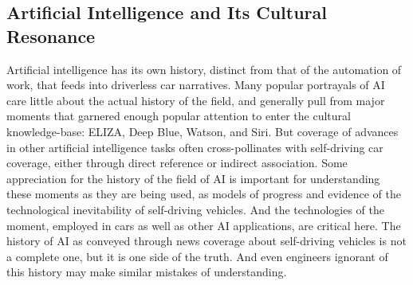 \subsection{Artificial Intelligence and Its Cultural Resonance}
Artificial intelligence has its own history, distinct from that of the
automation of work, that feeds into driverless car narratives. Many popular
portrayals of AI care little about the actual history of the field,
and generally pull from major moments that garnered enough popular
attention to enter the cultural knowledge-base: ELIZA, Deep Blue,
Watson, and Siri. But coverage of advances in other artificial
intelligence tasks often cross-pollinates with self-driving car
coverage, either through direct reference or indirect association.
Some appreciation for the history of the field
of AI is important for understanding these moments as they are being
used, as models of progress and evidence of the technological inevitability of
self-driving vehicles. And the technologies of the moment, employed in
cars as well as other AI applications, are critical here. The history
of AI as conveyed through news coverage about self-driving vehicles is
not a complete one, but it is one side of the truth. And even
engineers ignorant of this history may make similar mistakes of understanding.

